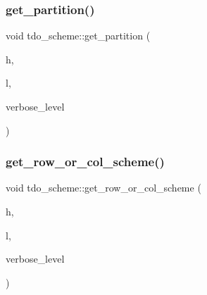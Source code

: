 \mbox{\label{classtdo__scheme_af6f141b86e464a6be4238b84b05a59c4}} 
\subsubsection{\texorpdfstring{get\+\_\+partition()}{get\_partition()}}
{\footnotesize\ttfamily void tdo\+\_\+scheme\+::get\+\_\+partition (\begin{DoxyParamCaption}\item[{\mbox{\hyperlink{galois_8h_a09fddde158a3a20bd2dcadb609de11dc}{I\+NT}}}]{h,  }\item[{\mbox{\hyperlink{galois_8h_a09fddde158a3a20bd2dcadb609de11dc}{I\+NT}}}]{l,  }\item[{\mbox{\hyperlink{galois_8h_a09fddde158a3a20bd2dcadb609de11dc}{I\+NT}}}]{verbose\+\_\+level }\end{DoxyParamCaption})}

\mbox{\label{classtdo__scheme_a8abe612cd722a42da85178d8ff577e54}} 
\subsubsection{\texorpdfstring{get\+\_\+row\+\_\+or\+\_\+col\+\_\+scheme()}{get\_row\_or\_col\_scheme()}}
{\footnotesize\ttfamily void tdo\+\_\+scheme\+::get\+\_\+row\+\_\+or\+\_\+col\+\_\+scheme (\begin{DoxyParamCaption}\item[{\mbox{\hyperlink{galois_8h_a09fddde158a3a20bd2dcadb609de11dc}{I\+NT}}}]{h,  }\item[{\mbox{\hyperlink{galois_8h_a09fddde158a3a20bd2dcadb609de11dc}{I\+NT}}}]{l,  }\item[{\mbox{\hyperlink{galois_8h_a09fddde158a3a20bd2dcadb609de11dc}{I\+NT}}}]{verbose\+\_\+level }\end{DoxyParamCaption})}

\mbox{\label{classtdo__scheme_ad12273edf8ebfd4141d2c30c59d4048f}} 
